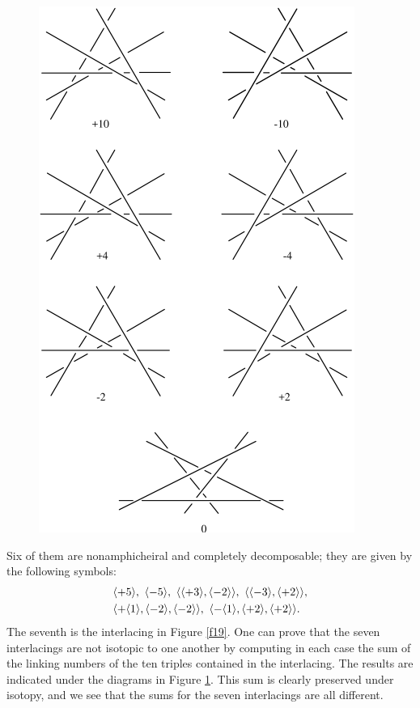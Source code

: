 \documentclass{article}
\begin{document}
\begin{figure}
{\includegraphics{imagesSkewlines/x25.png}}
\caption{}
\label{f25}
\end{figure}


Six of them are nonamphicheiral and 
completely decomposable; they are given by the following symbols:
\begin{align*}
&\langle+5\rangle,\ \langle-5\rangle,\ \langle\langle+3\rangle,\langle-2\rangle\rangle,\
\langle\langle-3\rangle,\langle+2\rangle\rangle,\\
&\langle+\langle1\rangle,\langle-2\rangle,\langle-2\rangle\rangle,\
\langle-\langle1\rangle,\langle+2\rangle,\langle+2\rangle\rangle.\end{align*}
The seventh is the interlacing in Figure \ref{f19}. One can prove that 
the seven
interlacings are not isotopic to one another by computing in each case the sum
of the linking numbers of the ten triples contained in the interlacing.
The results are indicated under the diagrams in Figure \ref{f25}. This 
sum is clearly
preserved under isotopy, and we see that the sums for the seven interlacings
are all different.
\end{document}
